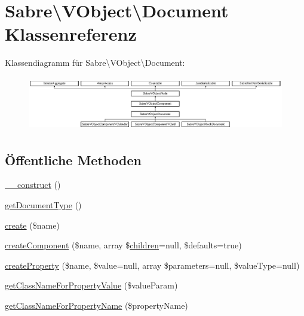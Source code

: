 \hypertarget{class_sabre_1_1_v_object_1_1_document}{}\section{Sabre\textbackslash{}V\+Object\textbackslash{}Document Klassenreferenz}
\label{class_sabre_1_1_v_object_1_1_document}
Klassendiagramm für Sabre\textbackslash{}V\+Object\textbackslash{}Document\+:\begin{figure}[H]
\begin{center}
\leavevmode
\includegraphics[height=2.372881cm]{class_sabre_1_1_v_object_1_1_document}
\end{center}
\end{figure}
\subsection*{Öffentliche Methoden}
\begin{DoxyCompactItemize}
\item 
\mbox{\hyperlink{class_sabre_1_1_v_object_1_1_document_a3d735f6345e32ba5fac61f29fea4ed40}{\+\_\+\+\_\+construct}} ()
\item 
\mbox{\hyperlink{class_sabre_1_1_v_object_1_1_document_a393de9a7021c76cc033b076e6420f5e3}{get\+Document\+Type}} ()
\item 
\mbox{\hyperlink{class_sabre_1_1_v_object_1_1_document_acbcbc5eab895f859204360f31b9e6b74}{create}} (\$name)
\item 
\mbox{\hyperlink{class_sabre_1_1_v_object_1_1_document_a2bcf38455c8396773dc0845075785e2d}{create\+Component}} (\$name, array \$\mbox{\hyperlink{class_sabre_1_1_v_object_1_1_component_a93c24cb817d101bf72ff065f64f8f2fd}{children}}=null, \$defaults=true)
\item 
\mbox{\hyperlink{class_sabre_1_1_v_object_1_1_document_a5cf7fd018f6a8bef965083e2fb511db0}{create\+Property}} (\$name, \$value=null, array \$parameters=null, \$value\+Type=null)
\item 
\mbox{\hyperlink{class_sabre_1_1_v_object_1_1_document_a6c80f6f00bf876fc919a0eb87db534b4}{get\+Class\+Name\+For\+Property\+Value}} (\$value\+Param)
\item 
\mbox{\hyperlink{class_sabre_1_1_v_object_1_1_document_a163c8f27bc993c650e7c87867e8ebfcf}{get\+Class\+Name\+For\+Property\+Name}} (\$property\+Name)
\end{DoxyCompactItemize}

